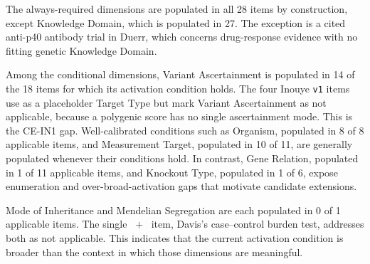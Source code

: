 The always-required dimensions are populated in all 28 items by
construction, except Knowledge Domain, which is populated in 27. The
exception is a cited anti-p40 antibody trial in Duerr, which concerns
drug-response evidence with no fitting genetic Knowledge Domain.

Among the conditional dimensions, Variant Ascertainment is populated in 14 of
the 18 items for which its activation condition holds. The four Inouye
\texttt{v1} items use  as a placeholder Target Type but mark
Variant Ascertainment as not applicable, because a polygenic score has no
single ascertainment mode. This is the CE-IN1 gap. Well-calibrated conditions
such as Organism, populated in 8 of 8 applicable items, and Measurement
Target, populated in 10 of 11, are generally populated whenever their
conditions hold. In contrast, Gene Relation, populated in 1 of 11 applicable
items, and Knockout Type, populated in 1 of 6, expose enumeration and
over-broad-activation gaps that motivate candidate extensions.

Mode of Inheritance and Mendelian Segregation are each populated in 0 of 1
applicable items. The single ~$+$~ item,
Davis's case--control burden test, addresses both as not applicable. This
indicates that the current activation condition is broader than the context in
which those dimensions are meaningful.
